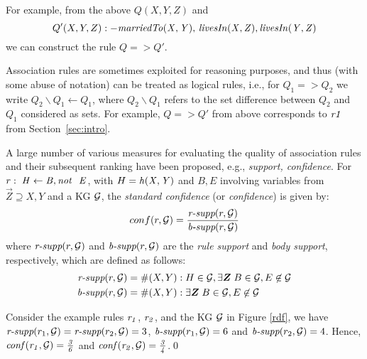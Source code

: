 For example, from the above $Q(X,Y,Z)$ and
\begin{equation}Q'(X,Y,Z):-\mathit{marriedTo(X,Y),\,livesIn(X,Z),\,} \mathit{livesIn(Y,Z)}
\end{equation} we can construct the rule $Q => Q'$. 
 

Association rules are sometimes exploited for reasoning purposes, and thus (with some abuse of notation) can be treated as logical rules, i.e., for $Q_1=>Q_2$ we write $Q_2\backslash Q_1 \leftarrow Q_1$, where $Q_2 \backslash Q_1$ refers to the set difference between $Q_2$ and $Q_1$ considered as sets. For example, $Q=>Q'$ from above corresponds to $\mathit{r1}$ from Section~\ref{sec:intro}.

A large number of various measures for evaluating the quality of association rules and their subsequent ranking have been proposed, e.g., \emph{support, confidence}. %
For $r:\;\mathit{H\leftarrow B, \mathit{not}~ \ E}$, with $H=\mathit{h(X,Y)}$ and $B,E$ involving variables from $\vec{Z}\supseteq X,Y$ and a KG $\mathcal{G}$, the \emph{standard confidence} (or \textit{confidence}) is given by:
\vspace{-.26cm}
\begin{align*}
conf(r,\mathcal{G})= \frac{\textit{r-supp}(r,\mathcal{G})}{\textit{b-supp}(r,\mathcal{G})}
\end{align*}
where $\textit{r-supp}(r,\mathcal{G})$ and $\textit{b-supp}(r ,\mathcal{G})$ are the \textit{rule support} and \textit{body support}, respectively, which are defined as follows:
\begin{align*}
\textit{r-supp}(r,\cG) &= \#(X,Y): H \in \cG, \exists \vec{Z}\;B\in \cG,E \not \in \cG\\
\textit{b-supp}(r,\cG) &= \#(X,Y):\exists \vec{Z}\; B\in \cG, E \not \in \cG
\end{align*}
\begin{example}
Consider the example rules $\mathit{r_1}$, $\mathit{r_2}$, and the KG $\mathcal{G}$ in Figure \ref{rdf}, we have $\textit{r-supp}(r_1,\mathcal{G}) = \textit{r-supp}(r_2,\mathcal{G}) = 3$, $\textit{b-supp}(r_1,\mathcal{G}) = 6$ and $\textit{b-supp}(r_2,\mathcal{G}) = 4$.
Hence, $\mathit{conf(r_1,\mathcal{G}) = \frac{3}{6}}$ and $\mathit{conf(r_2,\mathcal{G}) = \frac{3}{4}}$.\qed
\end{example}

